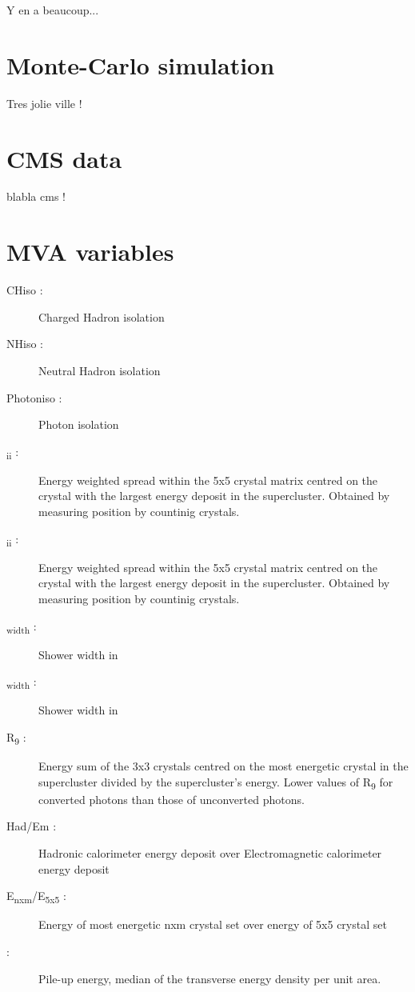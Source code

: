 \label{sec:unchapitre}

Y en a beaucoup...

\section{Monte-Carlo simulation}

Tres jolie ville !

\section{CMS data}

blabla cms !

\section{MVA variables}

\begin{description}
	\item [CHiso \textgamma :] Charged Hadron isolation
	\item [NHiso \textgamma :] Neutral Hadron isolation
	\item [Photoniso \textgamma :] Photon isolation
	\item [\textsigma\textsubscript{i\texteta i\texteta} :] Energy weighted spread within the 5x5 crystal matrix centred on the crystal with the largest energy deposit in the supercluster. Obtained by measuring position by countinig crystals.
	\item [\textsigma\textsubscript{i\texteta i\textphi} :] Energy weighted spread within the 5x5 crystal matrix centred on the crystal with the largest energy deposit in the supercluster. Obtained by measuring position by countinig crystals.
    \item [\texteta\textsubscript{width} \: \textgamma :] Shower width in \texteta
    \item [\textphi\textsubscript{width} \: \textgamma :] Shower width in \textphi
	\item [R\textsubscript{9} \: \textgamma :] Energy sum of the 3x3 crystals centred on the most energetic crystal in
    the supercluster divided by the supercluster's energy. Lower values of R\textsubscript{9} for converted photons than those of unconverted photons.
	\item [Had/Em :] Hadronic calorimeter energy deposit over Electromagnetic calorimeter energy deposit
    \item [E\textsubscript{nxm}/E\textsubscript{5x5} :] Energy of most energetic nxm crystal set over energy of 5x5 crystal set
    \item [\textrho :] Pile-up energy, median of the transverse energy density per unit area.
\end{description}

